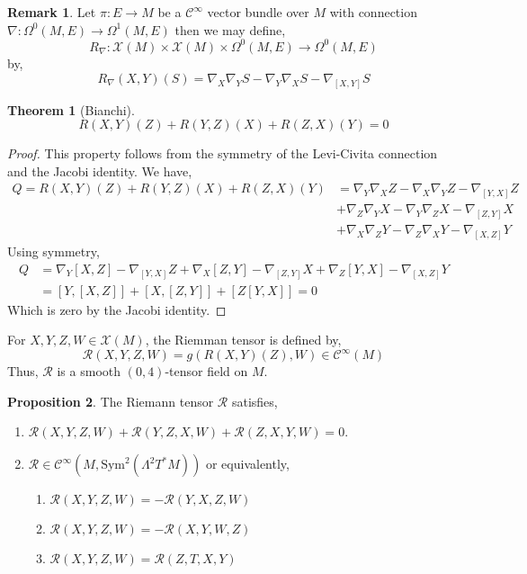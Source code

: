 \documentclass[12pt]{extarticle}
\theoremstyle{definition}
\newtheorem{theorem}{Theorem}[section]
\newtheorem{proposition}[theorem]{Proposition}
\newtheorem{remark}{Remark}
\newenvironment{definition}[1][Definition:]{\begin{trivlist}
\item[\hskip \labelsep {\bfseries #1}]}{\end{trivlist}}
\newcommand{\C}[1]{\mathcal{C}^{#1}}
\begin{document}
\begin{remark}
Let $\pi : E \to M$ be a $\C{\infty}$ vector bundle over $M$ with connection $\nabla : \Omega^0(M, E) \to \Omega^1(M, E)$ then we may define,
\[ R_{\nabla} : \mathscr{X}(M) \times \mathscr{X}(M) \times \Omega^0(M, E) \to \Omega^0(M, E) \]
by,
\[ R_{\nabla}(X,Y)(S) = \nabla_X \nabla_Y S - \nabla_Y \nabla_X S - \nabla_{[X,Y]} S \]
\end{remark}

\begin{theorem}[Bianchi]
\[ R(X,Y)(Z) + R(Y,Z)(X) + R(Z, X)(Y) = 0 \]
\end{theorem}

\begin{proof}
This property follows from the symmetry of the Levi-Civita connection and the Jacobi identity. We have,
\begin{align*}
Q = R(X,Y)(Z) + R(Y,Z)(X) + R(Z, X)(Y) & = \nabla_Y \nabla_X Z - \nabla_X \nabla_Y Z - \nabla_{[Y,X]} Z
\\
& + \nabla_Z \nabla_Y X - \nabla_Y \nabla_Z X - \nabla_{[Z,Y]} X
\\
& + \nabla_X \nabla_Z Y - \nabla_Z \nabla_X Y - \nabla_{[X,Z]} Y
\end{align*}
Using symmetry,
\begin{align*}
Q & = \nabla_Y [X, Z] - \nabla_{[Y,X]} Z + \nabla_X [Z, Y] - \nabla_{[Z,Y]} X + \nabla_Z [Y, X] - \nabla_{[X,Z]} Y
\\
& = [Y, [X,Z]] + [X, [Z, Y]] + [Z [Y, X]] = 0 
\end{align*}
Which is zero by the Jacobi identity. 
\end{proof}

\newcommand{\Rie}{\mathcal{R}}

\begin{definition}
For $X, Y, Z, W \in \mathscr{X}(M)$, the Riemman tensor is defined by,
\[ \Rie(X, Y, Z, W) = g(R(X, Y)(Z), W) \in \C{\infty}(M) \]
Thus, $\Rie$ is a smooth $(0,4)$-tensor field on $M$.
\end{definition}

\begin{proposition}
The Riemann tensor $\Rie$ satisfies,
\begin{enumerate}
\item $\Rie(X, Y, Z, W) + \Rie(Y, Z, X, W) + \Rie(Z, X, Y, W) = 0$.
\item $\Rie \in \C{\infty}(M, \mathrm{Sym}^2(\Lambda^2 T^* M))$ or equivalently,
\begin{enumerate}
\item $\Rie(X, Y, Z, W) = - \Rie(Y, X, Z, W)$
\item $\Rie(X, Y, Z, W) = - \Rie(X, Y, W, Z)$
\item $\Rie(X, Y, Z, W) = \Rie(Z, T, X, Y)$
\end{enumerate}
\end{enumerate}
\end{proposition}
\end{document}
